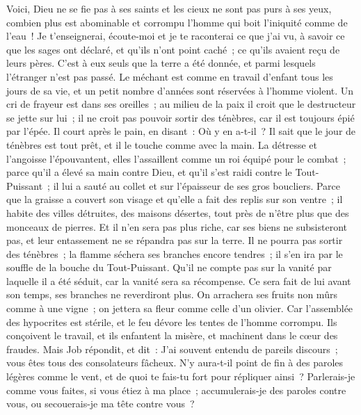 \begin{multicols}{2}
Voici, Dieu ne se fie pas à ses saints et les cieux ne sont pas purs à ses yeux,
combien plus est abominable et corrompu l'homme qui boit l'iniquité comme de l'eau~!
Je t'enseignerai, écoute-moi et je te raconterai ce que j'ai vu,
à savoir ce que les sages ont déclaré, et qu'ils n'ont point caché~; ce qu'ils avaient reçu de leurs pères.
C'est à eux seuls que la terre a été donnée, et parmi lesquels l'étranger n'est pas passé.
Le méchant est comme en travail d'enfant tous les jours de sa vie, et un petit nombre d'années sont réservées à l'homme violent.
Un cri de frayeur est dans ses oreilles~; au milieu de la paix il croit que le destructeur se jette sur lui~;
il ne croit pas pouvoir sortir des ténèbres, car il est toujours épié par l'épée.
Il court après le pain, en disant~: Où y en a-t-il~? Il sait que le jour de ténèbres est tout prêt, et il le touche comme avec la main.
La détresse et l'angoisse l'épouvantent, elles l'assaillent comme un roi équipé pour le combat~;
parce qu'il a élevé sa main contre Dieu, et qu'il s'est raidi contre le Tout-Puissant~;
il lui a sauté au collet et sur l'épaisseur de ses gros boucliers.
Parce que la graisse a couvert son visage et qu'elle a fait des replis sur son ventre~;
 il habite des villes détruites, des maisons désertes, tout près de n'être plus que des monceaux de pierres.
Et il n'en sera pas plus riche, car ses biens ne subsisteront pas, et leur entassement ne se répandra pas sur la terre.
Il ne pourra pas sortir des ténèbres~; la flamme séchera ses branches encore tendres~; il s'en ira par le souffle de la bouche du Tout-Puissant.
Qu'il ne compte pas sur la vanité par laquelle il a été séduit, car la vanité sera sa récompense.
Ce sera fait de lui avant son temps, ses branches ne reverdiront plus.
On arrachera ses fruits non mûrs comme à une vigne~; on jettera sa fleur comme celle d'un olivier.
Car l'assemblée des hypocrites est stérile, et le feu dévore les tentes de l'homme corrompu.
Ils conçoivent le travail, et ils enfantent la misère, et machinent dans le cœur des fraudes.
\VerseOne{}Mais Job répondit, et dit~:
J'ai souvent entendu de pareils discours~; vous êtes tous des consolateurs fâcheux.
N'y aura-t-il point de fin à des paroles légères comme le vent, et de quoi te fais-tu fort pour répliquer ainsi~?
Parlerais-je comme vous faites, si vous étiez à ma place~; accumulerais-je des paroles contre vous, ou secouerais-je ma tête contre vous~?

\end{multicols}
